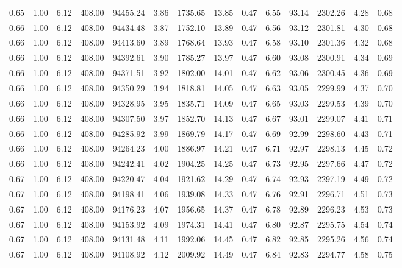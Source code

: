 \begin{table}[!ht]
\begin{tabular}{rrrrrrrrrrrrrr}
0.65 & 1.00 & 6.12 & 408.00 & 94455.24 & 3.86 & 1735.65 & 13.85 & 0.47 & 6.55 & 93.14 & 2302.26 & 4.28 & 0.68 \\
0.66 & 1.00 & 6.12 & 408.00 & 94434.48 & 3.87 & 1752.10 & 13.89 & 0.47 & 6.56 & 93.12 & 2301.81 & 4.30 & 0.68 \\
0.66 & 1.00 & 6.12 & 408.00 & 94413.60 & 3.89 & 1768.64 & 13.93 & 0.47 & 6.58 & 93.10 & 2301.36 & 4.32 & 0.68 \\
0.66 & 1.00 & 6.12 & 408.00 & 94392.61 & 3.90 & 1785.27 & 13.97 & 0.47 & 6.60 & 93.08 & 2300.91 & 4.34 & 0.69 \\
0.66 & 1.00 & 6.12 & 408.00 & 94371.51 & 3.92 & 1802.00 & 14.01 & 0.47 & 6.62 & 93.06 & 2300.45 & 4.36 & 0.69 \\
0.66 & 1.00 & 6.12 & 408.00 & 94350.29 & 3.94 & 1818.81 & 14.05 & 0.47 & 6.63 & 93.05 & 2299.99 & 4.37 & 0.70 \\
0.66 & 1.00 & 6.12 & 408.00 & 94328.95 & 3.95 & 1835.71 & 14.09 & 0.47 & 6.65 & 93.03 & 2299.53 & 4.39 & 0.70 \\
0.66 & 1.00 & 6.12 & 408.00 & 94307.50 & 3.97 & 1852.70 & 14.13 & 0.47 & 6.67 & 93.01 & 2299.07 & 4.41 & 0.71 \\
0.66 & 1.00 & 6.12 & 408.00 & 94285.92 & 3.99 & 1869.79 & 14.17 & 0.47 & 6.69 & 92.99 & 2298.60 & 4.43 & 0.71 \\
0.66 & 1.00 & 6.12 & 408.00 & 94264.23 & 4.00 & 1886.97 & 14.21 & 0.47 & 6.71 & 92.97 & 2298.13 & 4.45 & 0.72 \\
0.66 & 1.00 & 6.12 & 408.00 & 94242.41 & 4.02 & 1904.25 & 14.25 & 0.47 & 6.73 & 92.95 & 2297.66 & 4.47 & 0.72 \\
0.67 & 1.00 & 6.12 & 408.00 & 94220.47 & 4.04 & 1921.62 & 14.29 & 0.47 & 6.74 & 92.93 & 2297.19 & 4.49 & 0.72 \\
0.67 & 1.00 & 6.12 & 408.00 & 94198.41 & 4.06 & 1939.08 & 14.33 & 0.47 & 6.76 & 92.91 & 2296.71 & 4.51 & 0.73 \\
0.67 & 1.00 & 6.12 & 408.00 & 94176.23 & 4.07 & 1956.65 & 14.37 & 0.47 & 6.78 & 92.89 & 2296.23 & 4.53 & 0.73 \\
0.67 & 1.00 & 6.12 & 408.00 & 94153.92 & 4.09 & 1974.31 & 14.41 & 0.47 & 6.80 & 92.87 & 2295.75 & 4.54 & 0.74 \\
0.67 & 1.00 & 6.12 & 408.00 & 94131.48 & 4.11 & 1992.06 & 14.45 & 0.47 & 6.82 & 92.85 & 2295.26 & 4.56 & 0.74 \\
0.67 & 1.00 & 6.12 & 408.00 & 94108.92 & 4.12 & 2009.92 & 14.49 & 0.47 & 6.84 & 92.83 & 2294.77 & 4.58 & 0.75 \\

\end{tabular}
\end{table}
